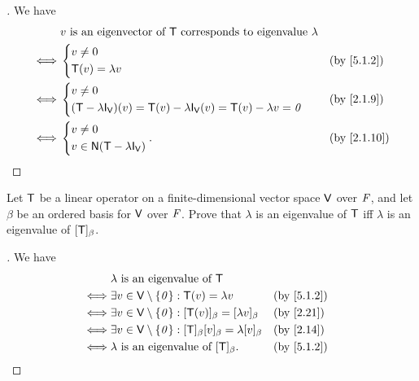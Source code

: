 \begin{proof}[]
  We have
  \begin{align*}
         & v \text{ is an eigenvector of } \T \text{ corresponds to eigenvalue } \lambda                             \\
    \iff & \begin{dcases}
             v \neq 0 \\
             \T(v) = \lambda v
           \end{dcases}                                                                &  & \text{(by \cref{5.1.2})} \\
    \iff & \begin{dcases}
             v \neq 0 \\
             (\T - \lambda \IT[\V])(v) = \T(v) - \lambda \IT[\V](v) = \T(v) - \lambda v = \zv
           \end{dcases} &  & \text{(by \cref{2.1.9})}                           \\
    \iff & \begin{dcases}
             v \neq 0 \\
             v \in \ns{\T - \lambda \IT[\V]}
           \end{dcases}.                                   &  & \text{(by \cref{2.1.10})}
  \end{align*}
\end{proof}

\exercisesection

\setcounter{ex}{5}
\begin{ex}\label{ex:5.1.6}
  Let \(\mathsf{T}\) be a linear operator on a finite-dimensional vector space \(\mathsf{V}\) over \(\mathit{F}\), and let \(\beta\) be an ordered basis for \(\mathsf{V}\) over \(\mathit{F}\).
  Prove that \(\lambda\) is an eigenvalue of \(\mathsf{T}\) iff \(\lambda\) is an eigenvalue of \([\mathsf{T}]_{\beta}\).
\end{ex}

\begin{proof}[]
  We have
  \begin{align*}
         & \lambda \text{ is an eigenvalue of } \T                                                                             \\
    \iff & \exists v \in \V \setminus \set{\zv} : \T(v) = \lambda v                              &  & \text{(by \cref{5.1.2})} \\
    \iff & \exists v \in \V \setminus \set{\zv} : [\T(v)]_{\beta} = [\lambda v]_{\beta}          &  & \text{(by \cref{2.21})}  \\
    \iff & \exists v \in \V \setminus \set{\zv} : [\T]_{\beta} [v]_{\beta} = \lambda [v]_{\beta} &  & \text{(by \cref{2.14})}  \\
    \iff & \lambda \text{ is an eigenvalue of } [\T]_{\beta}.                                    &  & \text{(by \cref{5.1.2})}
  \end{align*}
\end{proof}


